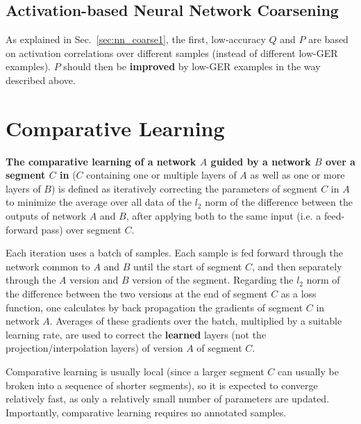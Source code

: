 \documentclass{article} %
\begin{document}
\subsection{Activation-based Neural Network Coarsening}
\label{sec:act-based-coarsening}
As explained in Sec.~\ref{sec:nn_coarse1}, the first, low-accuracy $Q$ and $P$ are based on activation correlations over different samples (instead of different low-GER examples). $P$ should then be \textbf{improved} by low-GER examples in the way described above.


\section{Comparative Learning}
\label{sec:tunning}
\textbf{The comparative learning of a network $A$ guided by a network $B$ over a segment $C$ in } ($C$ containing one or multiple layers of $A$ as well as one or more layers of $B$) is defined as iteratively correcting the parameters of segment $C$ in $A$ to minimize the average over all data of the $l_2$ norm of the difference between the outputs of network $A$ and $B$, after applying both to the same input (i.e. a feed-forward pass) over segment $C$.

Each iteration uses a batch of samples. Each sample is fed forward through the network common to $A$ and $B$ until the start of segment $C$, and then separately through the $A$ version and $B$ version of the segment. Regarding the $l_2$ norm of the difference between the two versions at the end of segment $C$ as a loss function, one calculates by back propagation the gradients of segment $C$ in network $A$. Averages of these gradients over the batch, multiplied by a suitable learning rate, are used to correct the \textbf{learned} layers (not the projection/interpolation layers) of version $A$ of segment $C$.

Comparative learning is usually local (since a larger segment $C$ can usually be broken into a sequence of shorter segments), so it is expected to converge relatively fast, as only a relatively small number of parameters are updated. Importantly, comparative learning requires no annotated samples.

\end{document}
